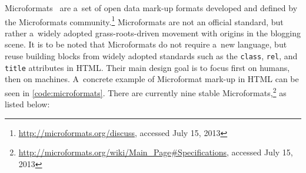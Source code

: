 Microformats~\cite{celik2006microformats} are a~set of
open data mark-up formats developed
and defined by the Microformats
community.\footnote{\url{http://microformats.org/discuss},
accessed July 15, 2013}
Microformats are not an official standard,
but rather a~widely adopted grass-roots-driven movement
with origins in the blogging scene.
It is to be noted that Microformats do not require a~new language,
but reuse building blocks from widely adopted standards
such as the \texttt{class}, \texttt{rel}, and \texttt{title}
attributes in HTML.
Their main design goal is to focus first on humans,
then on machines.
A~concrete example of Microformat mark-up in HTML
can be seen in \autoref{code:microformats}.
There are currently nine stable
Microformats,\footnote{\url{http://microformats.org/wiki/Main_Page\#Specifications}, accessed July 15, 2013}
as listed below:

